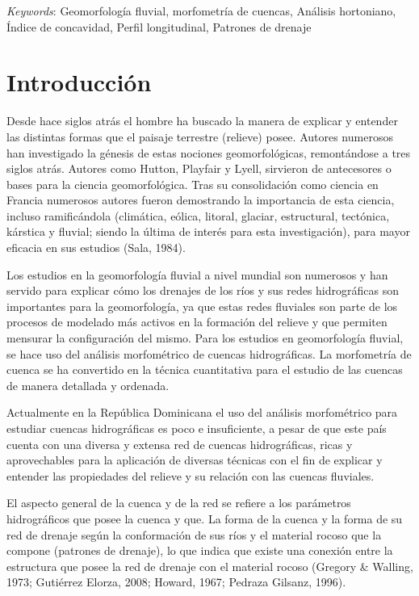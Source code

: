 \documentclass[11pt,]{article}
\renewenvironment{abstract}
 {{%
    \setlength{\leftmargin}{0mm}
    \setlength{\rightmargin}{\leftmargin}%
  }%
  \relax}
 {\endlist}
\begin{document}
\begin{abstract}
\vskip 8.5pt \noindent \emph{Keywords}: Geomorfología fluvial, morfometría de cuencas, Análisis hortoniano,
Índice de concavidad, Perfil longitudinal, Patrones de drenaje \par

    \hbox{\vrule height .2pt width 39.14pc}



\end{abstract}


\vskip 6.5pt


\noindent  \section{Introducción}\label{introducciuxf3n}

Desde hace siglos atrás el hombre ha buscado la manera de explicar y
entender las distintas formas que el paisaje terrestre (relieve) posee.
Autores numerosos han investigado la génesis de estas nociones
geomorfológicas, remontándose a tres siglos atrás. Autores como Hutton,
Playfair y Lyell, sirvieron de antecesores o bases para la ciencia
geomorfológica. Tras su consolidación como ciencia en Francia numerosos
autores fueron demostrando la importancia de esta ciencia, incluso
ramificándola (climática, eólica, litoral, glaciar, estructural,
tectónica, kárstica y fluvial; siendo la última de interés para esta
investigación), para mayor eficacia en sus estudios (Sala, 1984).

Los estudios en la geomorfología fluvial a nivel mundial son numerosos y
han servido para explicar cómo los drenajes de los ríos y sus redes
hidrográficas son importantes para la geomorfología, ya que estas redes
fluviales son parte de los procesos de modelado más activos en la
formación del relieve y que permiten mensurar la configuración del
mismo. Para los estudios en geomorfología fluvial, se hace uso del
análisis morfométrico de cuencas hidrográficas. La morfometría de cuenca
se ha convertido en la técnica cuantitativa para el estudio de las
cuencas de manera detallada y ordenada.

Actualmente en la República Dominicana el uso del análisis morfométrico
para estudiar cuencas hidrográficas es poco e insuficiente, a pesar de
que este país cuenta con una diversa y extensa red de cuencas
hidrográficas, ricas y aprovechables para la aplicación de diversas
técnicas con el fin de explicar y entender las propiedades del relieve y
su relación con las cuencas fluviales.

El aspecto general de la cuenca y de la red se refiere a los parámetros
hidrográficos que posee la cuenca y que. La forma de la cuenca y la
forma de su red de drenaje según la conformación de sus ríos y el
material rocoso que la compone (patrones de drenaje), lo que indica que
existe una conexión entre la estructura que posee la red de drenaje con
el material rocoso (Gregory \& Walling, 1973; Gutiérrez Elorza, 2008;
Howard, 1967; Pedraza Gilsanz, 1996).
\end{document}
